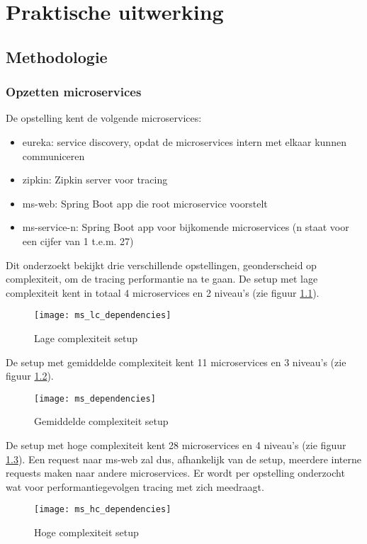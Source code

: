 
\chapter{Praktische uitwerking}
\label{ch:onderzoek}

\section{Methodologie}
\label{sec:methodologie}

\subsection{Opzetten microservices}
\label{sec:opzetten}

De opstelling kent de volgende microservices:
\begin{itemize}
\item eureka: service discovery, opdat de microservices intern met elkaar kunnen communiceren
\item zipkin: Zipkin server voor tracing
\item ms-web: Spring Boot app die root microservice voorstelt
\item ms-service-n: Spring Boot app voor bijkomende microservices (n staat voor een cijfer van 1 t.e.m. 27)
\end{itemize}

Dit onderzoekt bekijkt drie verschillende opstellingen, geonderscheid op complexiteit, om de tracing performantie na te gaan. De setup met lage complexiteit kent in totaal 4 microservices en 2 niveau's (zie figuur \ref{fig:lc_dependencies}).
\begin{figure}[h]
\caption{Lage complexiteit setup}
\texttt{[image: ms\_lc\_dependencies]}
\label{fig:lc_dependencies}
\end{figure}
De setup met gemiddelde complexiteit kent 11 microservices en 3 niveau's (zie figuur \ref{fig:mc_dependencies}).
\begin{figure}[h]
\caption{Gemiddelde complexiteit setup}
\texttt{[image: ms\_dependencies]}
\label{fig:mc_dependencies}
\end{figure}
De setup met hoge complexiteit kent 28 microservices en 4 niveau's (zie figuur \ref{fig:hc_dependencies}). Een request naar ms-web zal dus, afhankelijk van de setup, meerdere interne requests maken naar andere microservices. Er wordt per opstelling onderzocht wat voor performantiegevolgen tracing met zich meedraagt.
\begin{figure}[h]
\caption{Hoge complexiteit setup}
\texttt{[image: ms\_hc\_dependencies]}
\label{fig:hc_dependencies}
\end{figure}

